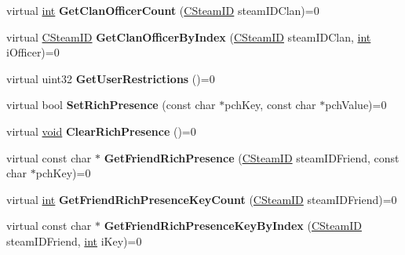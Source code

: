 \begin{DoxyCompactItemize}
\item 
\hypertarget{classISteamFriends_a7ff70728ac9a7d20ec96dc27255a7cd9}{}virtual \hyperlink{SDL__thread_8h_a6a64f9be4433e4de6e2f2f548cf3c08e}{int} {\bfseries Get\+Clan\+Officer\+Count} (\hyperlink{classCSteamID}{C\+Steam\+I\+D} steam\+I\+D\+Clan)=0\label{classISteamFriends_a7ff70728ac9a7d20ec96dc27255a7cd9}

\item 
\hypertarget{classISteamFriends_a79bf6ec72ccc6209a73c81755735ce8c}{}virtual \hyperlink{classCSteamID}{C\+Steam\+I\+D} {\bfseries Get\+Clan\+Officer\+By\+Index} (\hyperlink{classCSteamID}{C\+Steam\+I\+D} steam\+I\+D\+Clan, \hyperlink{SDL__thread_8h_a6a64f9be4433e4de6e2f2f548cf3c08e}{int} i\+Officer)=0\label{classISteamFriends_a79bf6ec72ccc6209a73c81755735ce8c}

\item 
\hypertarget{classISteamFriends_af4146ae496bb10eb92e13c198dfffb39}{}virtual uint32 {\bfseries Get\+User\+Restrictions} ()=0\label{classISteamFriends_af4146ae496bb10eb92e13c198dfffb39}

\item 
\hypertarget{classISteamFriends_a07752feeb6241be20afa797b7c1be1c2}{}virtual bool {\bfseries Set\+Rich\+Presence} (const char $\ast$pch\+Key, const char $\ast$pch\+Value)=0\label{classISteamFriends_a07752feeb6241be20afa797b7c1be1c2}

\item 
\hypertarget{classISteamFriends_a54dac8e99746df4d7e84d12e5c5216d5}{}virtual \hyperlink{SDL__audio_8h_a52835ae37c4bb905b903cbaf5d04b05f}{void} {\bfseries Clear\+Rich\+Presence} ()=0\label{classISteamFriends_a54dac8e99746df4d7e84d12e5c5216d5}

\item 
\hypertarget{classISteamFriends_a899948624d194f9941393910d85568dd}{}virtual const char $\ast$ {\bfseries Get\+Friend\+Rich\+Presence} (\hyperlink{classCSteamID}{C\+Steam\+I\+D} steam\+I\+D\+Friend, const char $\ast$pch\+Key)=0\label{classISteamFriends_a899948624d194f9941393910d85568dd}

\item 
\hypertarget{classISteamFriends_a5ec526f9066bdf9a81dce11b449f7476}{}virtual \hyperlink{SDL__thread_8h_a6a64f9be4433e4de6e2f2f548cf3c08e}{int} {\bfseries Get\+Friend\+Rich\+Presence\+Key\+Count} (\hyperlink{classCSteamID}{C\+Steam\+I\+D} steam\+I\+D\+Friend)=0\label{classISteamFriends_a5ec526f9066bdf9a81dce11b449f7476}

\item 
\hypertarget{classISteamFriends_a62314a0684def333acdab19bf88e1ff5}{}virtual const char $\ast$ {\bfseries Get\+Friend\+Rich\+Presence\+Key\+By\+Index} (\hyperlink{classCSteamID}{C\+Steam\+I\+D} steam\+I\+D\+Friend, \hyperlink{SDL__thread_8h_a6a64f9be4433e4de6e2f2f548cf3c08e}{int} i\+Key)=0\label{classISteamFriends_a62314a0684def333acdab19bf88e1ff5}


\end{DoxyCompactItemize}
